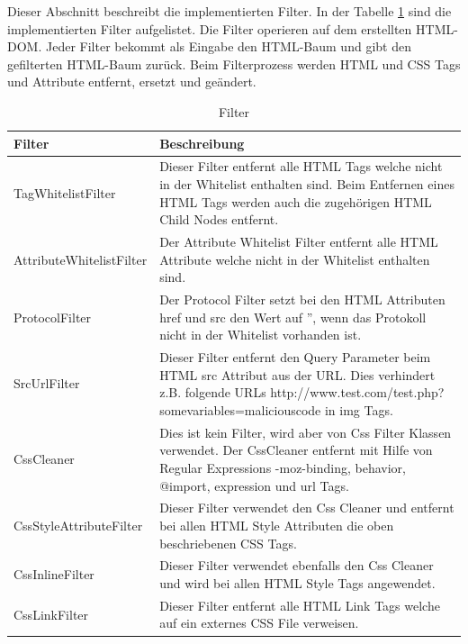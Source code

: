 Dieser Abschnitt beschreibt die implementierten Filter. 
In der Tabelle \ref{tab:filter} sind die implementierten Filter aufgelistet. Die Filter operieren auf dem erstellten HTML-DOM.
Jeder Filter bekommt als Eingabe den HTML-Baum und gibt den gefilterten HTML-Baum zurück. 
Beim Filterprozess werden HTML und CSS Tags und Attribute entfernt, ersetzt und geändert.
\newline
\begin{table}[H]
\begin{center}
\begin{tabular}{l p{10.5cm} }
\hline
\textbf{Filter} & \textbf{Beschreibung} \\ \hline \hline
TagWhitelistFilter & Dieser Filter entfernt alle HTML Tags welche nicht in der Whitelist enthalten sind. 
Beim Entfernen eines HTML Tags werden auch die zugehörigen HTML Child Nodes entfernt. \\ 

AttributeWhitelistFilter & Der Attribute Whitelist Filter entfernt alle HTML Attribute welche nicht in der Whitelist enthalten sind. \\

ProtocolFilter & Der Protocol Filter setzt bei den HTML Attributen href und src den Wert auf '', wenn das Protokoll nicht in der Whitelist vorhanden ist. \\

SrcUrlFilter & Dieser Filter entfernt den Query Parameter beim HTML src Attribut aus der URL. Dies verhindert z.B. folgende URLs http://www.test.com/test.php?somevariables=maliciouscode in img Tags. \\

CssCleaner & Dies ist kein Filter, wird aber von Css Filter Klassen verwendet. Der CssCleaner entfernt mit Hilfe von Regular Expressions -moz-binding, behavior, @import, expression und url Tags. \\

CssStyleAttributeFilter & Dieser Filter verwendet den Css Cleaner und entfernt bei allen HTML Style Attributen die oben beschriebenen CSS Tags. \\

CssInlineFilter & Dieser Filter verwendet ebenfalls den Css Cleaner und wird bei allen HTML Style Tags angewendet. \\

CssLinkFilter & Dieser Filter entfernt alle HTML Link Tags welche auf ein externes CSS File verweisen. \\

\hline \hline
\end{tabular}
\caption{Filter}
\label{tab:filter}
\end{center}
\end{table}

\newpage
